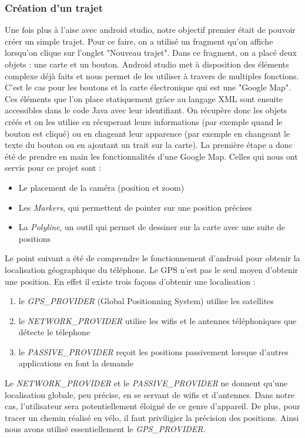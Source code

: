 \subsubsection{Création d'un trajet}
Une fois plus à l'aise avec android studio, notre objectif premier était de pouvoir créer un simple trajet. Pour ce faire, on a utilisé un
fragment qu'on affiche lorsqu'on clique sur l'onglet "Nouveau trajet". Dans ce fragment, on a placé deux objets : une carte et un bouton.
Android studio met à disposition des éléments complexe déjà faits et nous permet de les utiliser à travers de multiples fonctions. C'est le
cas pour les boutons et la carte électronique qui est une "Google Map". Ces éléments que l'on place statiquement grâce au langage XML sont
ensuite accessibles dans le code Java avec leur identifiant. On récupère donc les objets créés et on les utilise en récuperant leurs informations
(par exemple quand le bouton est cliqué) ou en chageant leur apparence (par exemple en changeant le texte du bouton ou en ajoutant un trait
sur la carte).
La première étape a donc été de prendre en main les fonctionnalités d'une Google Map. Celles qui nous ont servis pour ce projet sont :
\begin{itemize}
  \item Le placement de la caméra (position et zoom)
  \item Les \emph{Markers}, qui permettent de pointer sur une position précises
  \item La \emph{Polyline}, un outil qui permet de dessiner sur la carte avec une suite de positions
\end{itemize}
Le point suivant a été de comprendre le fonctionnement d'android pour obtenir la localisation géographique du téléphone. Le GPS n'est pas le
seul moyen d'obtenir une position. En effet il existe trois façons d'obtenir une localisation :
\begin{enumerate}
  \item le \emph{GPS\_PROVIDER} (Global Positionning System) utilise les satellites
  \item le \emph{NETWORK\_PROVIDER} utilise les wifis et le antennes téléphoniques que détecte le télephone
  \item le \emph{PASSIVE\_PROVIDER} reçoit les positions passivement lorsque d'autres applications en font la demande
\end{enumerate}
Le \emph{NETWORK\_PROVIDER} et le \emph{PASSIVE\_PROVIDER} ne donnent qu'une localisation globale, peu précise, en se servant de wifis
et d'antennes. Dans notre cas, l'utilisateur sera potentiellement éloigné de ce genre d'appareil. De plus, pour tracer un chemin réalisé
en vélo, il faut priviligier la précision des positions. Ainsi nous avons utilisé essentiellement le \emph{GPS\_PROVIDER}.

